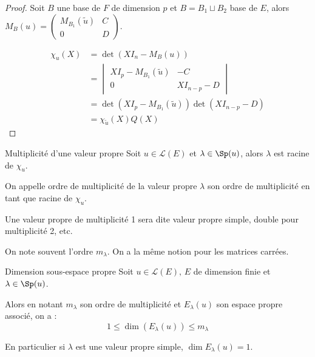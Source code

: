 
\begin{proof}
    Soit $B$ une base de $F$ de dimension $p$ et $B = B_1 \sqcup B_2$ base de $E$, alors 
    $M_B(u) = \begin{pmatrix}
        M_{B_1}(\tilde u) & C \\
        0 & D
    \end{pmatrix}$.

    \begin{align}
        \chi_u(X) & = \det(X I_n - M_B(u)) \\
                    & = \begin{vmatrix}
                        X I_p - M_{B_1}(\tilde u) & -C \\
                        0 & X I_{n - p} - D
                    \end{vmatrix} \\
                    & = \det(X I_p - M_{B_1}(\tilde u)) \det(X I_{n - p} - D) \\
                    & = \chi_{\tilde u}(X) Q (X)
    \end{align}
\end{proof}

\begin{definition}{Multiplicité d'une valeur propre}{}
    Soit $u \in \mathscr L(E)$ et $\lambda \in \Sp(u)$,
    alors $\lambda $ est racine de $\chi_u$.

    On appelle ordre de multiplicité de la valeur propre $\lambda$ son ordre de multiplicité en tant que racine de $\chi_u$.
\end{definition}

\begin{exemple}
    Une valeur propre de multiplicité 1 sera dite valeur propre simple, double pour multiplicité 2, etc.

    On note souvent l'ordre $m_\lambda$. On a la même notion pour les matrices carrées. 
\end{exemple}

\begin{proposition}{Dimension sous-espace propre}{}
    Soit $u \in \mathscr L(E), \, E$ de dimension finie et $\lambda \in \Sp(u)$. 

    Alors en notant $m_\lambda$ son ordre de multiplicité et $E_\lambda(u)$ son espace propre associé, on a :
    $$1 \leqslant \dim(E_\lambda(u)) \leqslant m_\lambda$$

    En particulier si $\lambda$ est une valeur propre simple, $\dim E_\lambda (u) = 1$.
\end{proposition}

